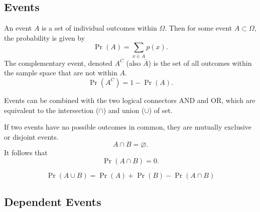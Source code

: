 \documentclass{article}
\begin{document}
\subsection{Events}
\begin{definition}[Events]
    An event $A$ is a set of individual outcomes within $\Omega$. 
    Then for some event $A\subset\Omega$, the probability is given by
    \begin{equation*}
        \Pr{\left( A \right)} = \sum_{x\in A} p(x).
    \end{equation*}
    The complementary event, denoted $A^C$ (also $\overline{A}$) is the set of all 
    outcomes within the sample space that are not within $A$.
    \begin{equation*}
        \Pr{\left( A^C \right)} = 1 - \Pr{\left( A \right)}.
    \end{equation*}
\end{definition}
\begin{theorem}
    Events can be combined with the two logical connectors AND and OR, which are
    equivalent to the intersection ($\cap$) and union ($\cup$) of set.
\end{theorem}
\begin{theorem}
    If two events have no possible outcomes in common, they are mutually exclusive or disjoint events.
    \begin{equation*}
        A \cap B = \varnothing.
    \end{equation*}
    It follows that
    \begin{equation*}
        \Pr{\left( A \cap B \right)} = 0.
    \end{equation*}
\end{theorem}
\begin{theorem}
    \begin{equation*}
        \Pr{\left( A \cup B \right)} = \Pr{\left( A \right)} + \Pr{\left( B \right)} - \Pr{\left( A \cap B \right)}
    \end{equation*}
\end{theorem}
\begin{theorem}
    
\end{theorem}
\subsection{Dependent Events}
\begin{definition}
    
\end{definition}
\begin{theorem}
    
\end{theorem}
\begin{theorem}
    
\end{theorem}
\end{document}
